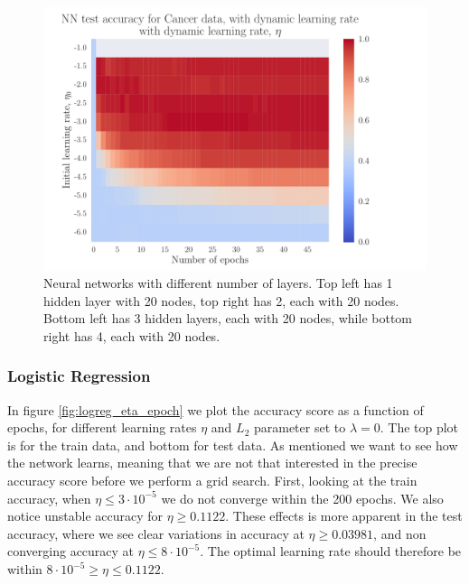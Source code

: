 \documentclass[12pt]{extarticle}
\begin{document}
\begin{figure}[h]
	\endminipage\hfill
	\includegraphics[width=\linewidth]{plots/NN_Cancer__epochs_dynamic_eta__test_accuracy__relu__274259.pdf}
	\endminipage
	\caption{Neural networks with different number of layers. Top left has 1 hidden layer with 20 nodes, top right has 2, each with 20 nodes. Bottom left has 3 hidden layers, each with 20 nodes, while bottom right has 4, each with 20 nodes.}\label{fig:NN_class_layers}
\end{figure}


\subsubsection{Logistic Regression}

In figure \ref{fig:logreg_eta_epoch} we plot the accuracy score as a function of epochs, for different learning rates $\eta$ and $L_2$ parameter set to $\lambda = 0$. The top plot is for the train data, and bottom for test data. As mentioned we want to see how the network learns, meaning that we are not that interested in the precise accuracy score before we perform a grid search. First, looking at the train accuracy, when $\eta \leq 3\cdot 10^{-5}$ we do not converge within the 200 epochs. We also notice unstable accuracy for $\eta\geq 0.1122$. These effects is more apparent in the test accuracy, where we see clear variations in accuracy at $\eta \geq 0.03981$, and non converging accuracy at $\eta\leq 8\cdot 10^{-5}$. The optimal learning rate should therefore be within $8\cdot 10^{-5} \geq \eta \leq 0.1122$.
\end{document}
